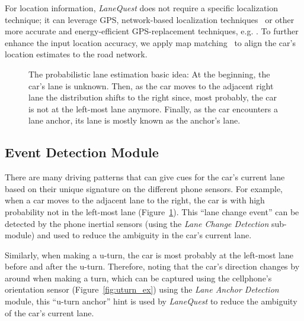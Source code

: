 \documentclass[10pt, conference, compsocconf]{IEEEtran}
\def \sys {\textit{LaneQuest}}
\begin{document}
For location information, \sys{} does not require a specific localization technique; it can leverage GPS, network-based localization techniques~\cite{cellsense,ibrahim2011hidden,ibrahim2010cellsense,ibrahim2013enabling,placelab} or other more accurate and energy-efficient GPS-replacement techniques, e.g. \cite{aly2013dejavu}. To further enhance the input location accuracy, we apply map matching~\cite{snapnet} to align the car's location estimates to the road network.
\begin{figure}[!t]
\centering
\caption{The probabilistic lane estimation basic idea: At the beginning, the car's lane is unknown. Then, as the car moves to the adjacent right lane the distribution shifts to the right since, most probably, the car is not at the left-most lane anymore. Finally, as the car encounters a lane anchor, its lane is mostly known as the anchor's lane.}
\label{fig:markov_ex}
\end{figure}
\subsection{Event Detection Module}
There are many driving patterns that can give cues for the car's current lane based on their unique signature on the different phone sensors. For example, when a car moves to the adjacent lane to the right, the car is with high probability not in the left-most lane (Figure~\ref{fig:markov_ex}). This ``lane change event'' can be detected by the phone inertial sensors (using the \emph{Lane Change Detection} sub-module) and used to reduce the ambiguity in the car's current lane.

Similarly, when making a u-turn, the car is most probably at the left-most lane before and after the u-turn. Therefore, noting that the car's direction changes by around  when making a turn, which can be captured using the cellphone's orientation sensor (Figure~\ref{fig:uturn_ex}) using the \emph{Lane Anchor Detection} module, this ``u-turn anchor'' hint is used by \sys{} to reduce the ambiguity of the car's current lane.
\end{document}
